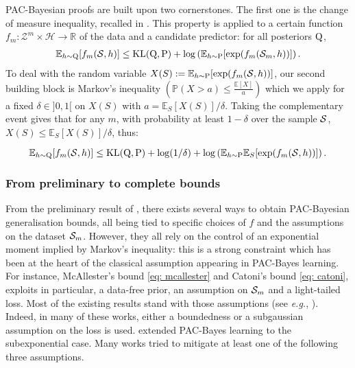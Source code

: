 PAC-Bayesian proofs are built upon two cornerstones. The first one is the change of measure inequality, recalled in .
This property is applied to a certain function $f_m: \mathcal{Z}^m \times \mathcal{H}\rightarrow \mathbb{R}$ of the data and a candidate predictor: for all posteriors $\Q$,
\begin{align}
\label{eq: change_meas_pacb-chap-2}
\mathbb{E}_{h\sim \Q}[f_m(\S,h)] \leq \KL(\Q,\P) + \log\left( \mathbb{E}_{h\sim \P}[\exp(f_m(\Sm,h))]  \right).
\end{align}
To deal with the random variable  $X(S):=\mathbb{E}_{h\sim \P}[\exp(f_m(\S,h))] $, our second building block is Markov's inequality $\left(\mathbb{P}(X>a) \leq \frac{\mathbb{E}[X]}{a}\right)$ which we apply for a fixed $\delta\in ]0,1[$ on $X(S)$ with $a= \mathbb{E}_S[X(S)]/\delta$.
Taking the complementary event gives that for any $m$, with probability at least $1-\delta$ over the sample $\S$, $X(S)\leq \mathbb{E}_S[X(S)]/\delta$, thus:



\begin{equation}
  \label{eq: prelim_pb_bound-chap-2}
  \mathbb{E}_{h\sim \Q}[f_m(\S,h)] \leq \operatorname{KL}(\Q,\P) + \log(1/\delta) + \log\left( \mathbb{E}_{h\sim \P}\mathbb{E}_{S}[\exp(f_m(\S,h))]  \right).
\end{equation}

\subsubsection{From preliminary to complete bounds}


From the preliminary result of , there exists several ways to obtain PAC-Bayesian generalisation bounds, all being tied to specific choices of $f$ and the assumptions on the dataset $\Sm$. However, they all rely on the control of an exponential moment implied by Markov's inequality: this is a strong constraint which has been at the heart of the classical assumption appearing in PAC-Bayes learning.
For instance, McAllester's bound \eqref{eq: mcallester} and Catoni's bound \eqref{eq: catoni}, exploits in particular, a data-free prior, an \iid assumption on $\Sm$ and a light-tailed loss. Most of the existing results stand with those assumptions (see \emph{e.g.}, \citealp{catoni2007pac,germain2009pac,guedj2013pac,tolstikhin2013pac,guedj2018pac,mhammedi2019pac,wu2022split}).
Indeed, in many of these works, either a boundedness or a subgaussian assumption on the loss is used.  \citet{catoni2004statistical} extended PAC-Bayes learning to the subexponential case. Many works tried to mitigate at least one of the following three assumptions.


